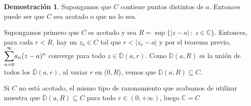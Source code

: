 \documentclass[12pt,twoside]{report}
\theoremstyle{azul}
\theoremstyle{azul2}
\theoremstyle{plain}
\theoremstyle{definition}
\newtheorem*{dem}{Demostración}
\theoremstyle{remark}
\begin{document}
\begin{dem}
Supongamos que $C$ contiene puntos distintos de $a$. Entonces puede ser que $C$ sea acotado o que no lo sea. 

Supongamos primero que $C$ es acotado y sea $R= \sup\{|z-a| \: : \: z \in \mathbb{C}\}$. Entonces, para cada $r < R$, hay un $z_o \in C$ tal que  $r < |z_o - a|$ y por el teorema previo, $\mathlarger{\sum_{n=0}^{\infty}} a_n (z-a)^n$ converge para todo $z \in \overline{\mathbb{D}}(a,r)$. Como $\mathbb{D}(a,R)$ es la unión de todos los $\overline{\mathbb{D}}(a,r)$, al variar $r$ en ($0,R$), vemos que ${\mathbb{D}}(a,R) \subseteq C$. 

Si $C$ no está acotado, el mismo tipo de razonamiento que acabamos de utilizar muestra que $\overline{\mathbb{D}}(a,R) \subseteq C$ para todo $r \in (0, + \infty)$, luego $\mathbb{C} = C$
\end{dem}
\end{document}
